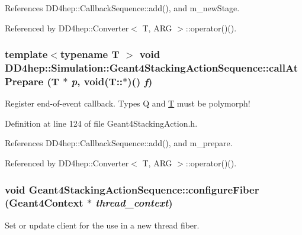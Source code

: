 References DD4hep::CallbackSequence::add(), and m\_\-newStage.

Referenced by DD4hep::Converter$<$ T, ARG $>$::operator()().\hypertarget{class_d_d4hep_1_1_simulation_1_1_geant4_stacking_action_sequence_ab8f7094741075bb59ba07ef0c33d1c6c}{
\subsubsection[{callAtPrepare}]{\setlength{\rightskip}{0pt plus 5cm}template$<$typename T $>$ void DD4hep::Simulation::Geant4StackingActionSequence::callAtPrepare ({\bf T} $\ast$ {\em p}, \/  void(T::$\ast$)() {\em f})}}
\label{class_d_d4hep_1_1_simulation_1_1_geant4_stacking_action_sequence_ab8f7094741075bb59ba07ef0c33d1c6c}


Register end-\/of-\/event callback. Types Q and \hyperlink{class_t}{T} must be polymorph! 

Definition at line 124 of file Geant4StackingAction.h.

References DD4hep::CallbackSequence::add(), and m\_\-prepare.

Referenced by DD4hep::Converter$<$ T, ARG $>$::operator()().\hypertarget{class_d_d4hep_1_1_simulation_1_1_geant4_stacking_action_sequence_af292bcae909cc6b7bc4a94c0f0e07b9c}{
\subsubsection[{configureFiber}]{\setlength{\rightskip}{0pt plus 5cm}void Geant4StackingActionSequence::configureFiber ({\bf Geant4Context} $\ast$ {\em thread\_\-context})}}
\label{class_d_d4hep_1_1_simulation_1_1_geant4_stacking_action_sequence_af292bcae909cc6b7bc4a94c0f0e07b9c}


Set or update client for the use in a new thread fiber. 

